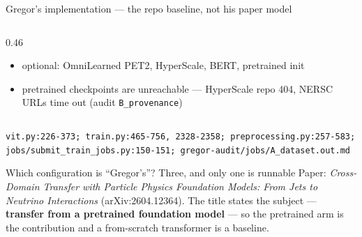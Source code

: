 \documentclass[aspectratio=169,10pt]{beamer}
\newcommand{\warn}[1]{\textcolor{warn}{#1}}
\newcommand{\src}[1]{{\scriptsize\color{gray}\texttt{#1}}}
\begin{document}
\begin{frame}{Gregor's implementation --- the repo baseline, \warn{not his paper model}}
\begin{columns}[T]
\begin{column}{0.46\textwidth}
\begin{itemize}
        \item optional: OmniLearned PET2, HyperScale, BERT, pretrained init
        \item \warn{pretrained checkpoints are unreachable} --- HyperScale repo 404,
          NERSC URLs time out (audit \texttt{B\_provenance})
      \end{itemize}
    \end{column}
  \end{columns}
  \vspace{0.3em}
  \src{vit.py:226-373; train.py:465-756, 2328-2358; preprocessing.py:257-583;
       jobs/submit\_train\_jobs.py:150-151; gregor-audit/jobs/A\_dataset.out.md}
\end{frame}

\begin{frame}[t]{Which configuration is ``Gregor's''? Three, and only one is runnable}
  \vspace{0.2em}
  {\footnotesize Paper: \emph{Cross-Domain Transfer with Particle Physics Foundation
  Models: From Jets to Neutrino Interactions} (arXiv:2604.12364). The title states the
  subject --- \textbf{transfer from a pretrained foundation model} --- so the pretrained
  arm is the contribution and a from-scratch transformer is a baseline.}
  \vspace{0.4em}


\end{frame}
\end{document}
